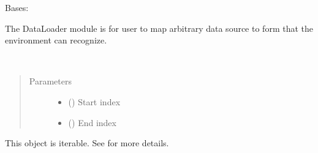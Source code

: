 \documentclass[letterpaper,10pt,english]{sphinxmanual}
\begin{document}
\begin{fulllineitems}
\label{\detokenize{DataLoader:crypto_env.dataloader.DataLoader}}
\sphinxAtStartPar
Bases: 

\sphinxAtStartPar
The DataLoader module is for user to map arbitrary data source to form that the environment can recognize.

\begin{fulllineitems}
\label{\detokenize{DataLoader:crypto_env.dataloader.DataLoader.__init__}}~\begin{quote}\begin{description}
\item[{Parameters}] \leavevmode\begin{itemize}
\item {} 
\sphinxAtStartPar
{} () \textendash{} Start index

\item {} 
\sphinxAtStartPar
{} () \textendash{} End index

\end{itemize}

\end{description}\end{quote}

\end{fulllineitems}


\begin{fulllineitems}
\label{\detokenize{DataLoader:crypto_env.dataloader.DataLoader.__iter__}}
\sphinxAtStartPar
This object is iterable. See  for more details.


\end{fulllineitems}
\end{fulllineitems}
\end{document}
